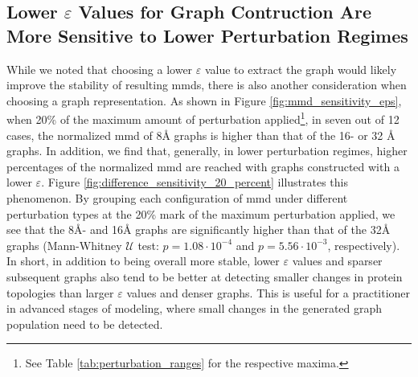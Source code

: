 \subsection{Lower $\varepsilon$ Values for Graph Contruction Are More
Sensitive to Lower Perturbation Regimes}\label{sec:sensitivity}
While we noted that choosing a lower $\varepsilon$ value
to extract the graph would likely improve the stability of resulting \gls{mmd}s, there
is also another consideration when choosing a graph representation. As shown in
Figure \ref{fig:mmd_sensitivity_eps}, when 20\% of the maximum amount of
perturbation applied\footnote{See Table \ref{tab:perturbation_ranges} for the
respective maxima.}, in seven out of 12 cases, the normalized \gls{mmd} of
8\si{\angstrom} graphs is higher than that of the 16- or 32 \si{\angstrom} graphs. In
addition, we find that, generally, in lower perturbation regimes, higher
percentages of the normalized \gls{mmd} are reached with graphs constructed with a
lower $\varepsilon$. Figure \ref{fig:difference_sensitivity_20_percent}
illustrates this phenomenon. By grouping each configuration of \gls{mmd} under
different perturbation types at the 20\% mark of the maximum perturbation
applied, we see that the 8\si{\angstrom}- and 16\si{\angstrom} graphs are
significantly higher than that of the 32\si{\angstrom} graphs (Mann-Whitney
$\mathcal{U}$ test: $p=1.08\cdot 10^{-4}$ and $p=5.56\cdot 10^{-3}$,
respectively). In short, in addition to being overall more stable, lower
$\varepsilon$ values and sparser subsequent graphs also tend to be better at
detecting smaller changes in protein topologies than larger $\varepsilon$ values
and denser graphs. This is useful for a practitioner in advanced stages of
modeling, where small changes in the generated graph population need to be
detected.


